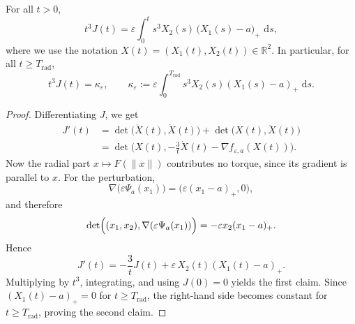 \documentclass[10pt,a4paper]{amsart}
\newcommand{\dd}{\,\mathrm{d}}
\begin{document}
\begin{lemma}\label{lem:J-balance}
For all $t>0$,
\[
    t^3J (t)
  =
  \varepsilon \int_0^t s^3 X_{2}(s)\,\bigl(X_{1}(s)-a\bigr)_+\,\dd s,
\]
where we use the notation $X(t)=(X_1(t),X_2(t))\in \mathbb{R}^2$.
In particular, for all $t\ge T_\mathrm{rad}$,
\[
    t^3J (t)=\kappa_\varepsilon,
  \qquad
  \kappa_\varepsilon:=
  \varepsilon \int_0^{T_\mathrm{rad}} s^3 X_{2}(s)(X_{1}(s)-a)_+\,\dd s.
\]
\end{lemma}

\begin{proof}
Differentiating $J $, we get
\begin{align*}
  J '(t)
  &=
  \det\bigl(\dot X (t),\dot X (t)\bigr)
  +\det\bigl(X (t),\ddot X (t)\bigr)\\
  &=
  \det\!\Big(
    X (t),
    -\frac{3}{t}\dot X (t)-\nabla f_{\varepsilon,a}(X (t))
  \Big).
\end{align*}
Now the radial part $x\mapsto F(\|x\|)$ contributes no torque, since its gradient is parallel to $x$. For the perturbation,
\[
  \nabla\bigl(\varepsilon\Psi_a(x_1)\bigr)
  =
  \bigl(\varepsilon(x_1-a)_+,0\bigr),
\]
and therefore
\[
  \det\Bigl((x_1,x_2),\nabla(\varepsilon\Psi_a(x_1))\Bigr)
  =
  -\varepsilon x_2(x_1-a)_+.
\]
Hence
\[
  J '(t)
  =
  -\frac{3}{t}J (t)
  +
  \varepsilon\,X_{2}(t)(X_{1}(t)-a)_+.
\]
Multiplying by $t^3$, integrating, and using $J (0)=0$ yields the first claim.
Since $(X_{1}(t)-a)_+=0$ for $t\ge T_\mathrm{rad}$, the right-hand side becomes constant for $t\ge T_\mathrm{rad}$, proving the second claim.
\end{proof}
\end{document}
